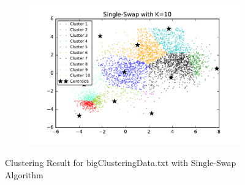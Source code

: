 \begin{figure}[htb]
\begin{subfigure}[b]{0.475\textwidth}
            \includegraphics[width=\textwidth]{./figures/bigClustering_singleSwap_10.pdf}
        \end{subfigure}
        
        \caption{Clustering Result for bigClusteringData.txt with Single-Swap Algorithm}
        \label{fig:kmean_clustering}
\end{figure}

